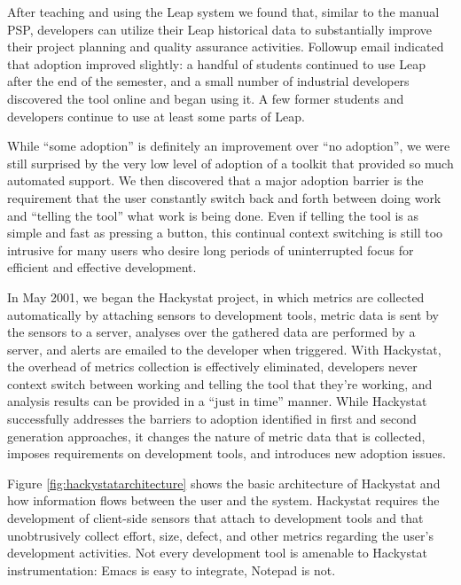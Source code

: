 \documentclass[12pt]{article}
\begin{document}
After teaching and using the Leap system we found that, similar to the
manual PSP, developers can utilize their Leap historical data to
substantially improve their project planning and quality assurance
activities.  Followup email indicated that adoption improved slightly: a
handful of students continued to use Leap after the end of the semester,
and a small number of industrial developers discovered the tool online and
began using it.  A few former students and developers continue
to use at least some parts of Leap.

While ``some adoption'' is definitely an improvement over ``no adoption'',
we were still surprised by the very low level of adoption of a toolkit that
provided so much automated support.  We then discovered that a major
adoption barrier is the requirement that the user constantly switch back
and forth between doing work and ``telling the tool'' what work is being
done.  Even if telling the tool is as simple and fast as pressing a button,
this continual context switching is still too intrusive for many users who
desire long periods of uninterrupted focus for efficient and effective
development.

In May 2001, we began the Hackystat project, in which metrics are collected
automatically by attaching sensors to development tools, metric data is
sent by the sensors to a server, analyses over
the gathered data are performed by a server, and alerts are emailed to the
developer when triggered. With Hackystat, the overhead of metrics collection
is effectively eliminated, developers never context switch between
working and telling the tool that they're working, and analysis results can
be provided in a ``just in time'' manner.  While Hackystat successfully
addresses the barriers to adoption identified in first and second
generation approaches, it changes the nature of metric data that is
collected, imposes requirements on development tools, and introduces new
adoption issues. 


Figure \ref{fig:hackystatarchitecture} shows the basic architecture of
Hackystat and how information flows between the user and the system.
Hackystat requires the development of client-side sensors that 
attach to development tools and that unobtrusively collect
effort, size, defect, and other metrics regarding the user's development
activities.    Not every development tool is amenable to Hackystat
instrumentation: Emacs is easy to integrate, Notepad is not. 
\end{document}
